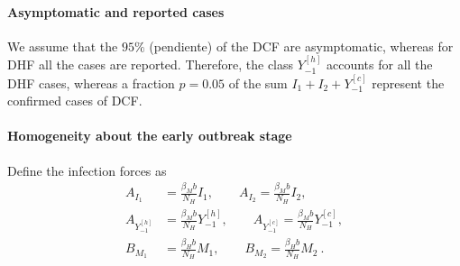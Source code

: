     \paragraph{Asymptomatic and reported cases}


    We assume that the $95\%$ (pendiente) of the \ac{DCF} are asymptomatic, whereas for 
    \ac{DHF}  all the cases are reported. Therefore, the class $Y_{-1}^{[h]}$ accounts for
    all the \ac{DHF} cases, whereas a fraction $p=0.05$ of the sum 
    $I_1+ I_2 + Y_{-1}^{[c]}$ represent the confirmed cases of \ac{DCF}.


    \paragraph{Homogeneity about the early outbreak stage}

    Define the infection forces as
    \begin{equation}
        \begin{aligned}
            A_{I_1} &=
                \frac{\beta_Mb}{N_H} I_1, \qquad
            A_{I_2}=
                \frac{\beta_Mb}{N_H} I_2,
        \\
            A_{Y_{-1}^{[h]}}&=
            \frac{\beta_Mb}{N_H} Y_{-1} ^{[h]}, \qquad
            A_{Y_{-1}^{[c]}}=
                \frac{\beta_Mb}{N_H} Y_{-1}^{[c]},
        \\
            B_{M_1} &= 
                \frac{\beta_Hb}{N_H}M_1, \qquad
            B_{M_2}=
                \frac{\beta_Hb}{N_H}M_2 ~.
        \end{aligned}
    \end{equation}
